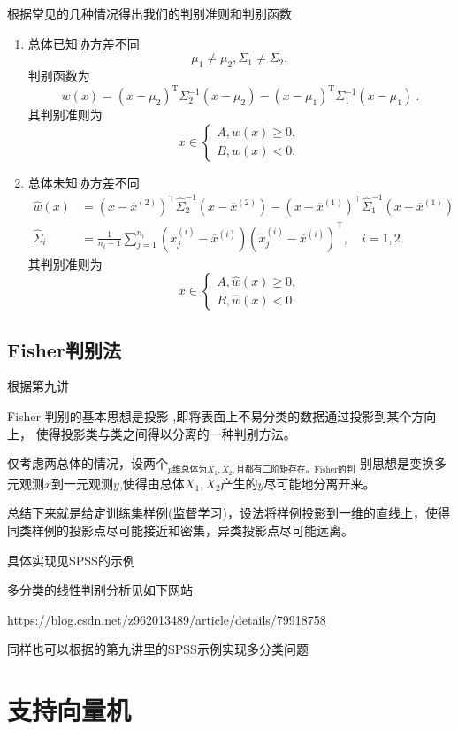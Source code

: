 \documentclass[12pt]{ctexart}
\numberwithin{equation}{section} %
\begin{document}
根据常见的几种情况得出我们的判别准则和判别函数
\begin{enumerate}
  \item 总体已知协方差不同
 $$\mu_1\neq\mu_2,\Sigma_1\neq\Sigma_2,$$
  判别函数为
  $$w(x)=(x-\mu_{2})^{\mathrm{T}}\Sigma_{2}^{-1}(x-\mu_{2})-(x-\mu_{1})^{\mathrm{T}}\Sigma_{1}^{-1}(x-\mu_{1})\:.$$
  其判别准则为
  $$x\in\begin{cases}A,w(x)\geqslant0,\\B,w(x)<0.\end{cases}$$
  \item 总体未知协方差不同
  \begin{align*}
    \hat{w}(x) &= (x - \overline{x}^{(2)})^\top \hat{\Sigma}_2^{-1} (x - \overline{x}^{(2)}) - (x - \overline{x}^{(1)})^\top \hat{\Sigma}_1^{-1} (x - \overline{x}^{(1)}) \\
    \hat{\Sigma}_i &= \frac{1}{n_i - 1} \sum_{j=1}^{n_i} \left( x_j^{(i)} - \overline{x}^{(i)} \right) \left( x_j^{(i)} - \overline{x}^{(i)} \right)^\top, \quad i = 1, 2
    \end{align*}
    其判别准则为
    $$x\in\begin{cases}A,\hat{w}(x)\geqslant0,\\B,\hat{w}(x)<0.\end{cases}$$
\end{enumerate}
\subsection{Fisher判别法}

根据\cite{清风}第九讲

Fisher 判别的基本思想是投影 ,即将表面上不易分类的数据通过投影到某个方向上，
使得投影类与类之间得以分离的一种判别方法。

仅考虑两总体的情况，设两个$_{p\text{维总体为}X_1,X_2,\text{且都有二阶矩存在。Fisher的判}}$ 别思想是变换多元观测$x$到一元观测$y$,使得由总体$X_1,X_2$产生的$y$尽可能地分离开来。

总结下来就是给定训练集样例(监督学习)，设法将样例投影到一维的直线上，使得同类样例的投影点尽可能接近和密集，异类投影点尽可能远离。
 
具体实现见SPSS的示例

多分类的线性判别分析见如下网站

\href{https://blog.csdn.net/z962013489/article/details/79918758}{https://blog.csdn.net/z962013489/article/details/79918758}

  同样也可以根据\cite{清风}的第九讲里的SPSS示例实现多分类问题
\section{支持向量机}
\end{document}
